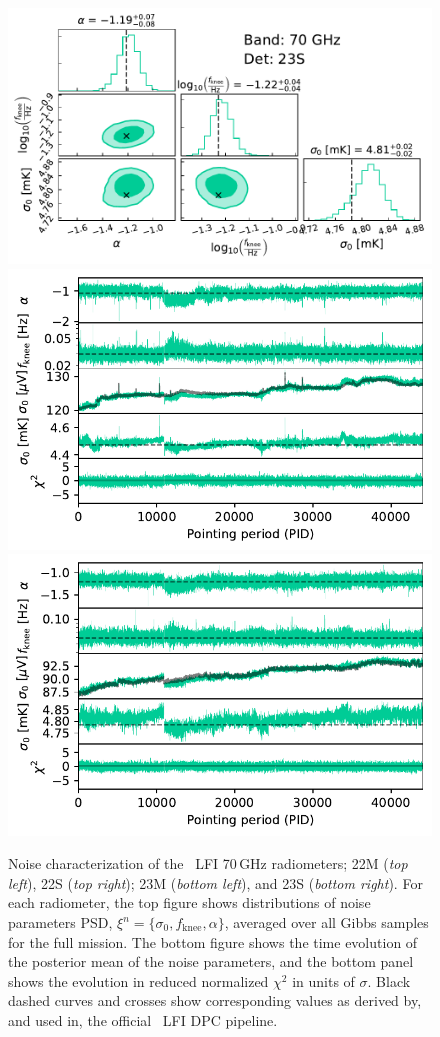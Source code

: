 \documentclass[twocolumn]{aa}
\begin{document}
\begin{figure}[p]
\begin{center}
		\includegraphics[width=0.495\linewidth]{figs/corner_band_070_det_12_mean.pdf}\\
		\includegraphics[width=0.495\linewidth]{figs/xi_vs_pid_band_070_det_11_mean.pdf}
		\includegraphics[width=0.495\linewidth]{figs/xi_vs_pid_band_070_det_12_mean.pdf}
		 \vspace*{-5.4mm}            
	\end{center}
	
	\caption{Noise characterization of the \Planck\ LFI 70\,GHz
		radiometers; 22M (\emph{top left}), 22S (\emph{top right}); 23M
		(\emph{bottom left}), and 23S (\emph{bottom right}). For each
		radiometer, the top figure shows distributions of noise parameters
		PSD, $\xi^n = \{\sigma_0, f_\mathrm{knee}, \alpha\}$, averaged
		over all Gibbs samples for the full mission. The bottom figure
		shows the time evolution of the posterior mean of the noise
		parameters, and the bottom panel shows the evolution in reduced
		normalized $\chi^2$ in units of $\sigma$. Black dashed curves and crosses show corresponding values as derived by, and used in, the
		official \Planck\ LFI DPC pipeline.
		\label{fig:xi_prop_70_3}}
\end{figure}
\end{document}
